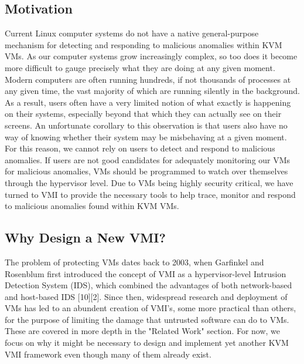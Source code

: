 \documentclass{report}
\begin{document}
\begin{spacing}{1.5}
\section{Motivation}
{\large
Current Linux computer systems do not have a native general-purpose mechanism for detecting and responding to malicious anomalies within KVM VMs. As our computer systems grow increasingly complex, so too does it become more difficult to gauge precisely what they are doing at any given moment. Modern computers are often running hundreds, if not thousands of processes at any given time, the vast majority of which are running silently in the background. As a result, users often have a very limited notion of what exactly is happening on their systems, especially beyond that which they can actually see on their screens. An unfortunate corollary to this observation is that users also have no way of knowing whether their system may be misbehaving at a given moment. For this reason, we cannot rely on users to detect and respond to malicious anomalies. If users are not good candidates for adequately monitoring our VMs for malicious anomalies, VMs should be programmed to watch over themselves through the hypervisor level. Due to VMs being highly security critical, we have turned to VMI to provide the necessary tools to help trace, monitor and respond to malicious anomalies found within KVM VMs.
\newline
}




\subsection{Why Design a New VMI?}

{\large
The problem of protecting VMs dates back to 2003, when Garfinkel and Rosenblum first introduced the concept of VMI as a hypervisor-level Intrusion Detection System (IDS), which combined the advantages of both network-based and host-based IDS [10][2]. Since then, widespread research and deployment of VMs has led to an abundent creation of VMI's, some more practical than others, for the purpose of limiting the damage that untrusted software can do to VMs. These are covered in more depth in the "Related Work" section. For now, we focus on why it might be necessary to design and implement yet another KVM VMI framework even though many of them already exist.
\newline
}



\end{spacing}
\end{document}
